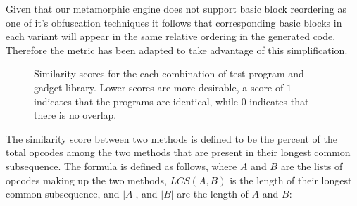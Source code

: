     Given that our metamorphic engine does not support basic block
    reordering as one of it's obfuscation techniques it follows that
    corresponding basic blocks in each variant will appear in the same
    relative ordering in the generated code. Therefore the metric has been
    adapted to take advantage of this simplification.

    \begin{figure}[t]
        \vspace{-50pt}
        \caption{Similarity scores for the each combination of test program
        and gadget library. Lower scores are more desirable, a score of $1$
        indicates that the programs are identical, while $0$ indicates that
        there is no overlap.}
        \label{tab:results-different}
    \end{figure}
    The similarity score between two methods is defined to be the percent of
    the total opcodes among the two methods that are present in their longest
    common subsequence. The formula is defined as follows, where
    $A$ and $B$ are the lists of opcodes making up the two methods,
    $LCS(A,B)$ is the length of their longest common subsequence, and $|A|$,
    and $|B|$ are the length of $A$ and $B$:


